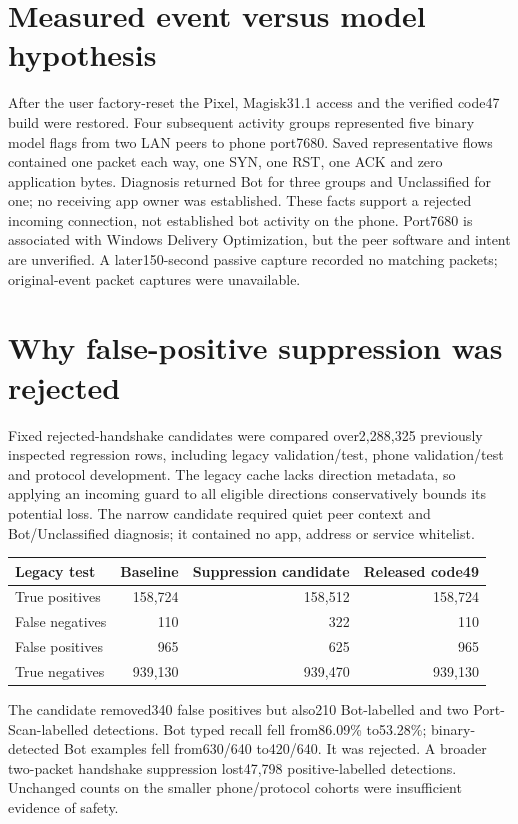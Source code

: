 \section{Measured event versus model hypothesis}
After the user factory-reset the Pixel, Magisk31.1 access and the verified code47 build were restored. Four subsequent activity groups represented five binary model flags from two LAN peers to phone port7680. Saved representative flows contained one packet each way, one SYN, one RST, one ACK and zero application bytes. Diagnosis returned Bot for three groups and Unclassified for one; no receiving app owner was established. These facts support a rejected incoming connection, not established bot activity on the phone. Port7680 is associated with Windows Delivery Optimization, but the peer software and intent are unverified. A later150-second passive capture recorded no matching packets; original-event packet captures were unavailable.

\section{Why false-positive suppression was rejected}
Fixed rejected-handshake candidates were compared over2,288,325 previously inspected regression rows, including legacy validation/test, phone validation/test and protocol development. The legacy cache lacks direction metadata, so applying an incoming guard to all eligible directions conservatively bounds its potential loss. The narrow candidate required quiet peer context and Bot/Unclassified diagnosis; it contained no app, address or service whitelist.

\begin{center}\small
\begin{tabular}{lrrr}\toprule
Legacy test & Baseline & Suppression candidate & Released code49\\\midrule
True positives &158,724&158,512&158,724\\
False negatives &110&322&110\\
False positives &965&625&965\\
True negatives &939,130&939,470&939,130\\\bottomrule
\end{tabular}\end{center}

The candidate removed340 false positives but also210 Bot-labelled and two Port-Scan-labelled detections. Bot typed recall fell from86.09\% to53.28\%; binary-detected Bot examples fell from630/640 to420/640. It was rejected. A broader two-packet handshake suppression lost47,798 positive-labelled detections. Unchanged counts on the smaller phone/protocol cohorts were insufficient evidence of safety.

